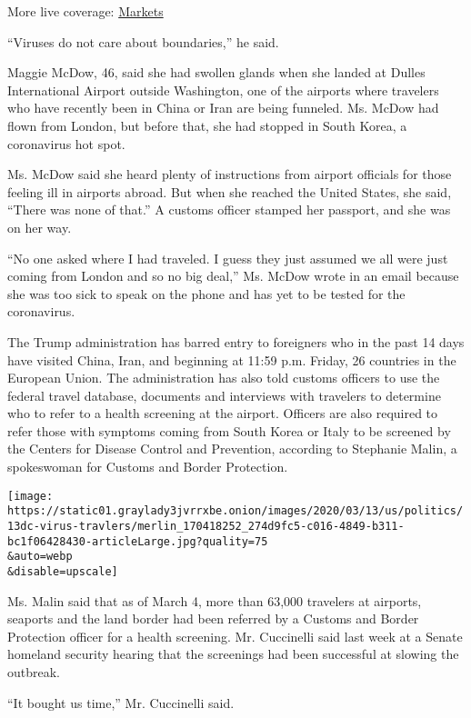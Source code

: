 More live coverage:
\href{https://www.nytimes3xbfgragh.onion/live/2020/09/11/business/stock-market-today-coronavirus?action=click\&pgtype=Article\&state=default\&region=MAIN_CONTENT_1\&context=storylines_live_updates}{Markets}

``Viruses do not care about boundaries,'' he said.

Maggie McDow, 46, said she had swollen glands when she landed at Dulles
International Airport outside Washington, one of the airports where
travelers who have recently been in China or Iran are being funneled.
Ms. McDow had flown from London, but before that, she had stopped in
South Korea, a coronavirus hot spot.

Ms. McDow said she heard plenty of instructions from airport officials
for those feeling ill in airports abroad. But when she reached the
United States, she said, ``There was none of that.'' A customs officer
stamped her passport, and she was on her way.

``No one asked where I had traveled. I guess they just assumed we all
were just coming from London and so no big deal,'' Ms. McDow wrote in an
email because she was too sick to speak on the phone and has yet to be
tested for the coronavirus.

The Trump administration has barred entry to foreigners who in the past
14 days have visited China, Iran, and beginning at 11:59 p.m. Friday, 26
countries in the European Union. The administration has also told
customs officers to use the federal travel database, documents and
interviews with travelers to determine who to refer to a health
screening at the airport. Officers are also required to refer those with
symptoms coming from South Korea or Italy to be screened by the Centers
for Disease Control and Prevention, according to Stephanie Malin, a
spokeswoman for Customs and Border Protection.

\texttt{[image: https://static01.graylady3jvrrxbe.onion/images/2020/03/13/us/politics/13dc-virus-travlers/merlin\_170418252\_274d9fc5-c016-4849-b311-bc1f06428430-articleLarge.jpg?quality=75\\\&auto=webp\\\&disable=upscale]}

Ms. Malin said that as of March 4, more than 63,000 travelers at
airports, seaports and the land border had been referred by a Customs
and Border Protection officer for a health screening. Mr. Cuccinelli
said last week at a Senate homeland security hearing that the screenings
had been successful at slowing the outbreak.

``It bought us time,'' Mr. Cuccinelli said.

